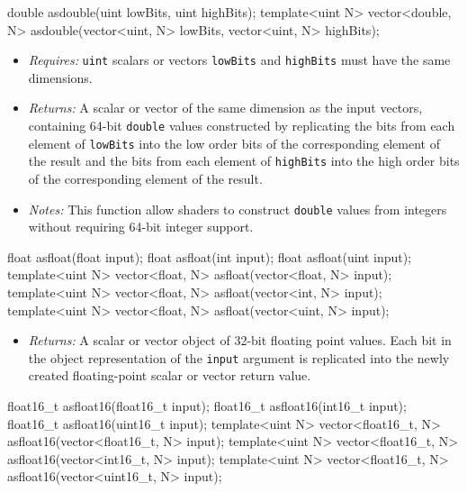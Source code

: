 
\begin{HLSL}
double asdouble(uint lowBits, uint highBits);
template<uint N> vector<double, N> asdouble(vector<uint, N> lowBits, vector<uint, N> highBits);
\end{HLSL}

\begin{itemize}
  \item \textit{Requires:} \texttt{uint} scalars or vectors \texttt{lowBits} and
  \texttt{highBits} must have the same dimensions.
  \item \textit{Returns:} A scalar or vector of the same dimension as the input
  vectors, containing 64-bit \texttt{double} values constructed by replicating
  the bits from each element of \texttt{lowBits} into the low order bits of the
  corresponding element of the result and the bits from each element of
  \texttt{highBits} into the high order bits of the corresponding element of the
  result.
  \item \textit{Notes:} This function allow shaders to construct \texttt{double}
  values from integers without requiring 64-bit integer support.
\end{itemize}

\begin{HLSL}
float asfloat(float input);
float asfloat(int input);
float asfloat(uint input);
template<uint N> vector<float, N> asfloat(vector<float, N> input);
template<uint N> vector<float, N> asfloat(vector<int, N> input);
template<uint N> vector<float, N> asfloat(vector<uint, N> input);
\end{HLSL}

\begin{itemize}
  \item \textit{Returns:} A scalar or vector object of 32-bit floating point
  values. Each bit in the object representation of the \texttt{input} argument
  is replicated into the newly created floating-point scalar or
  vector return value.
\end{itemize}

\begin{HLSL}
float16_t asfloat16(float16_t input);
float16_t asfloat16(int16_t input);
float16_t asfloat16(uint16_t input);
template<uint N> vector<float16_t, N> asfloat16(vector<float16_t, N> input);
template<uint N> vector<float16_t, N> asfloat16(vector<int16_t, N> input);
template<uint N> vector<float16_t, N> asfloat16(vector<uint16_t, N> input);
\end{HLSL}

